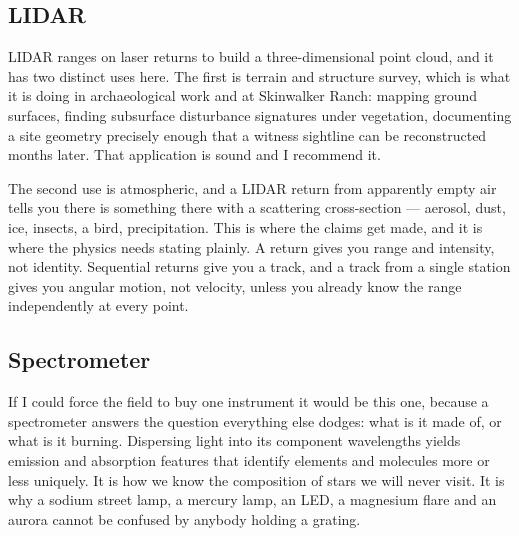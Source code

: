 \Needspace*{0.40\textheight}
\subsection{LIDAR}

LIDAR ranges on laser returns to build a three-dimensional point cloud, and it has two distinct
uses here. The first is terrain and structure survey, which is what it is doing in
archaeological work and at Skinwalker Ranch: mapping ground surfaces, finding subsurface
disturbance signatures under vegetation, documenting a site geometry precisely enough that a
witness sightline can be reconstructed months later. That application is sound and I recommend
it.

The second use is atmospheric, and a LIDAR return from apparently empty air tells you there is
something there with a scattering cross-section --- aerosol, dust, ice, insects, a bird,
precipitation. This is where the claims get made, and it is where the physics needs stating
plainly. A return gives you range and intensity, not identity. Sequential returns give you a
track, and a track from a single station gives you angular motion, not velocity, unless you
already know the range independently at every point. 

\Needspace*{0.40\textheight}
\subsection{Spectrometer}

If I could force the field to buy one instrument it would be this one, because a spectrometer
answers the question everything else dodges: what is it made of, or what is it burning.
Dispersing light into its component wavelengths yields emission and absorption features that
identify elements and molecules more or less uniquely. It is how we know the composition of
stars we will never visit. It is why a sodium street lamp, a mercury lamp, an LED, a magnesium
flare and an aurora cannot be confused by anybody holding a grating.

